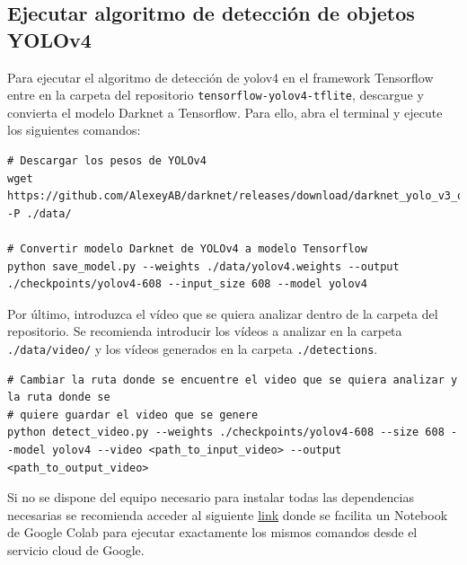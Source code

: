\subsection{Ejecutar algoritmo de detección de objetos YOLOv4}
\label{subsec:ejecutar-deteccion-yolov4}

Para ejecutar el algoritmo de detección de \gls{yolov4} en el framework Tensorflow entre en la carpeta del repositorio \texttt{tensorflow-yolov4-tflite}, descargue y convierta el modelo Darknet a Tensorflow. Para ello, abra el terminal y ejecute los siguientes comandos:

\vspace{0.5cm}
\begin{lstlisting}[language=iPython,caption=Descarga de pesos y conversion modelo YOLOv4,captionpos=b,label={lst:descarga-weights-convertir-modelo}]
# Descargar los pesos de YOLOv4
wget https://github.com/AlexeyAB/darknet/releases/download/darknet_yolo_v3_optimal/yolov4.weights -P ./data/

# Convertir modelo Darknet de YOLOv4 a modelo Tensorflow
python save_model.py --weights ./data/yolov4.weights --output ./checkpoints/yolov4-608 --input_size 608 --model yolov4
\end{lstlisting}

Por último, introduzca el vídeo que se quiera analizar dentro de la carpeta del repositorio. Se recomienda introducir los vídeos a analizar en la carpeta \texttt{./data/video/} y los vídeos generados en la carpeta \texttt{./detections}.

\vspace{0.5cm}
\begin{lstlisting}[language=iPython,caption=Ejecutar script detección de objetos con YOLOv4 en Tensorflow,captionpos=b,label={lst:ejecutar-yolov4-tf}]
# Cambiar la ruta donde se encuentre el video que se quiera analizar y la ruta donde se
# quiere guardar el video que se genere
python detect_video.py --weights ./checkpoints/yolov4-608 --size 608 --model yolov4 --video <path_to_input_video> --output <path_to_output_video>
\end{lstlisting}

Si no se dispone del equipo necesario para instalar todas las dependencias necesarias se recomienda acceder al siguiente \href{https://colab.research.google.com/drive/1ZwcfV2hFZKcsyXaqKp9AGuEi5TY-QwVW?usp=sharing}{link} donde se facilita un Notebook de Google Colab para ejecutar exactamente los mismos comandos desde el servicio cloud de Google.

